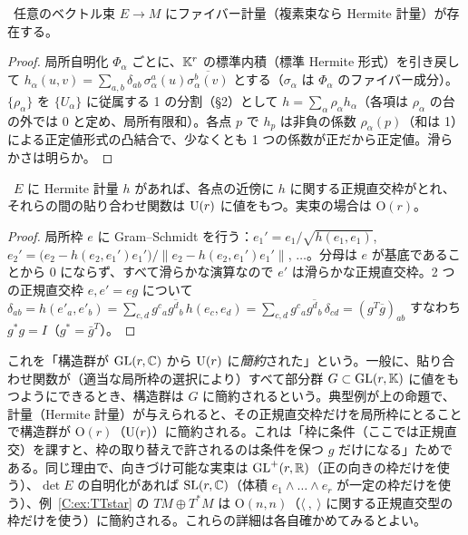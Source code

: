 \begin{thm}[計量の存在]\label{C:thm:metric}\tP\
任意のベクトル束 $E\to M$ にファイバー計量（複素束なら Hermite 計量）が存在する。
\end{thm}
\begin{proof}
局所自明化 $\Phi_\alpha$ ごとに、$\mathbb K^r$ の標準内積（標準 Hermite 形式）を引き戻して $h_\alpha(u,v)=\sum_{a,b}\delta_{ab}\,\sigma_\alpha^a(u)\overline{\sigma_\alpha^b(v)}$ とする（$\sigma_\alpha$ は $\Phi_\alpha$ のファイバー成分）。$\{\rho_\alpha\}$ を $\{U_\alpha\}$ に従属する 1 の分割（§2）として $h=\sum_\alpha\rho_\alpha h_\alpha$（各項は $\rho_\alpha$ の台の外では $0$ と定め、局所有限和）。各点 $p$ で $h_p$ は非負の係数 $\rho_\alpha(p)$（和は 1）による正定値形式の凸結合で、少なくとも 1 つの係数が正だから正定値。滑らかさは明らか。
\end{proof}

\begin{prop}[構造群のユニタリ簡約]\label{C:prop:unitary}\tP\
$E$ に Hermite 計量 $h$ があれば、各点の近傍に $h$ に関する正規直交枠がとれ、それらの間の貼り合わせ関数は $\mathrm{U}(r)$ に値をもつ。実束の場合は $\mathrm O(r)$。
\end{prop}
\begin{proof}
局所枠 $e$ に Gram--Schmidt を行う：$e_1'=e_1/\sqrt{h(e_1,e_1)}$, $e_2'=\bigl(e_2-h(e_2,e_1')e_1'\bigr)/\bigl\|e_2-h(e_2,e_1')e_1'\bigr\|$, $\dots$。分母は $e$ が基底であることから $0$ にならず、すべて滑らかな演算なので $e'$ は滑らかな正規直交枠。2 つの正規直交枠 $e,e'=eg$ について $\delta_{ab}=h(e'_a,e'_b)=\sum_{c,d}g^c{}_a\overline{g^d{}_b}\,h(e_c,e_d)=\sum_{c,d}g^c{}_a\overline{g^d{}_b}\,\delta_{cd}=(g^T\overline g)_{ab}$ すなわち $g^*g=I$（$g^*=\bar g^T$）。
\end{proof}
これを「構造群が $\mathrm{GL}(r,\mathbb C)$ から $\mathrm{U}(r)$ に\emph{簡約}された」という。一般に、貼り合わせ関数が（適当な局所枠の選択により）すべて部分群 $G\subset\mathrm{GL}(r,\mathbb K)$ に値をもつようにできるとき、構造群は $G$ に簡約されるという。典型例が上の命題で、計量（Hermite 計量）が与えられると、その正規直交枠だけを局所枠にとることで構造群が $\mathrm O(r)$（$\mathrm{U}(r)$）に簡約される。これは「枠に条件（ここでは正規直交）を課すと、枠の取り替えで許されるのは条件を保つ $g$ だけになる」ためである。同じ理由で、向きづけ可能な実束は $\mathrm{GL}^+(r,\mathbb R)$（正の向きの枠だけを使う）、$\det E$ の自明化があれば $\mathrm{SL}(r,\mathbb C)$（体積 $e_1\wedge\dots\wedge e_r$ が一定の枠だけを使う）、例~\ref{C:ex:TTstar} の $TM\oplus T^*M$ は $\mathrm O(n,n)$（$\langle\ ,\ \rangle$ に関する正規直交型の枠だけを使う）に簡約される。これらの詳細は各自確かめてみるとよい。


